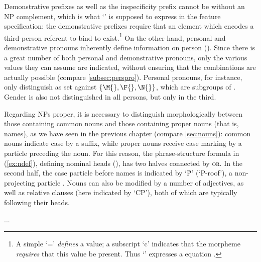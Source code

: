 Demonstrative prefixes as well as the inspecificity prefix  
cannot be without an NP complement, which is what `\req{}' is supposed to 
express in the feature specification: the demonstrative prefixes require that 
an element which encodes a third-person referent to bind to exist.\footnote{A 
simple `=' \emph{defines} a value; a subscript `c' indicates that the morpheme 
\emph{requires} that this value be present. Thus `\req{}' expresses a 
 equation \citep[59--61]{bresnan2016}.} On the other hand, 
personal and demonstrative pronouns inherently define information on person 
(\Pers{}). Since there is a great number of both personal and demonstrative 
pronouns, only the various values they can assume are indicated, without 
ensuring that the combinations are actually possible (compare 
\autoref{subsec:perspro}). Personal pronouns, for instance, only distinguish 
\Inan{} as set against $\{\M{}, \F{}, \N{}\}$, which are subgroups of \An{}. 
Gender is also not distinguished in all persons, but only in the third.

Regarding NPs proper, it is necessary to distinguish morphologically between 
those containing common nouns and those containing proper nouns (that is,  
names), as we have seen in the previous chapter (compare \autoref{sec:nouns}): 
common nouns indicate case by a suffix, while proper nouns receive case marking 
by a particle preceding the noun. For this reason, the phrase-structure formula 
in (\ref{ex:ndef}), defining nominal heads (), has two halves 
connected by \textsc{or}. In the second half, the case particle before names is 
indicated by `\^P' (`P-roof'), a non-projecting particle 
\citep[116--117]{bresnan2016}. Nouns can also be modified by a number of 
adjectives, as well as relative clauses (here indicated by `CP'), both of which 
are typically following their heads.

...

%
%
%
%
